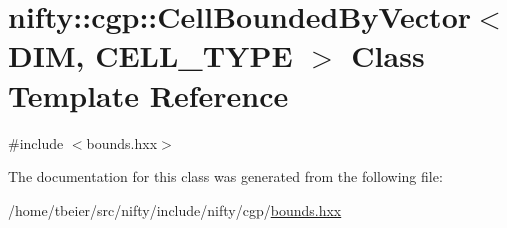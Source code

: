 \hypertarget{classnifty_1_1cgp_1_1CellBoundedByVector}{}\section{nifty\+:\+:cgp\+:\+:Cell\+Bounded\+By\+Vector$<$ D\+I\+M, C\+E\+L\+L\+\_\+\+T\+Y\+P\+E $>$ Class Template Reference}
\label{classnifty_1_1cgp_1_1CellBoundedByVector}


{\ttfamily \#include $<$bounds.\+hxx$>$}



The documentation for this class was generated from the following file\+:\begin{DoxyCompactItemize}
\item 
/home/tbeier/src/nifty/include/nifty/cgp/\hyperlink{bounds_8hxx}{bounds.\+hxx}\end{DoxyCompactItemize}
